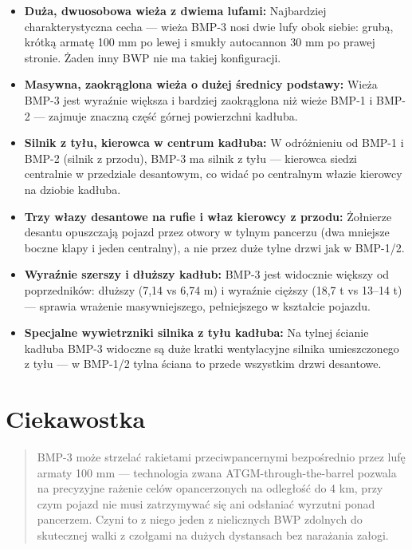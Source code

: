 \documentclass[12pt,openany,oneside]{book}
\providecommand{\tightlist}{%
  \setlength{\itemsep}{0pt}\setlength{\parskip}{0pt}}
\begin{document}
\begin{itemize}
\tightlist
\item
  \textbf{Duża, dwuosobowa wieża z dwiema lufami:} Najbardziej
  charakterystyczna cecha --- wieża BMP-3 nosi dwie lufy obok siebie:
  grubą, krótką armatę 100 mm po lewej i smukły autocannon 30 mm po
  prawej stronie. Żaden inny BWP nie ma takiej konfiguracji.
\item
  \textbf{Masywna, zaokrąglona wieża o dużej średnicy podstawy:} Wieża
  BMP-3 jest wyraźnie większa i bardziej zaokrąglona niż wieże BMP-1 i
  BMP-2 --- zajmuje znaczną część górnej powierzchni kadłuba.
\item
  \textbf{Silnik z tyłu, kierowca w centrum kadłuba:} W odróżnieniu od
  BMP-1 i BMP-2 (silnik z przodu), BMP-3 ma silnik z tyłu --- kierowca
  siedzi centralnie w przedziale desantowym, co widać po centralnym
  włazie kierowcy na dziobie kadłuba.
\item
  \textbf{Trzy włazy desantowe na rufie i właz kierowcy z przodu:}
  Żołnierze desantu opuszczają pojazd przez otwory w tylnym pancerzu
  (dwa mniejsze boczne klapy i jeden centralny), a nie przez duże tylne
  drzwi jak w BMP-1/2.
\item
  \textbf{Wyraźnie szerszy i dłuższy kadłub:} BMP-3 jest widocznie
  większy od poprzedników: dłuższy (7,14 vs 6,74 m) i wyraźnie cięższy
  (18,7 t vs 13--14 t) --- sprawia wrażenie masywniejszego, pełniejszego
  w kształcie pojazdu.
\item
  \textbf{Specjalne wywietrzniki silnika z tyłu kadłuba:} Na tylnej
  ścianie kadłuba BMP-3 widoczne są duże kratki wentylacyjne silnika
  umieszczonego z tyłu --- w BMP-1/2 tylna ściana to przede wszystkim
  drzwi desantowe.
\end{itemize}

\section{Ciekawostka}\label{ciekawostka-5}

\begin{quote}
BMP-3 może strzelać rakietami przeciwpancernymi bezpośrednio przez lufę
armaty 100 mm --- technologia zwana ATGM-through-the-barrel pozwala na
precyzyjne rażenie celów opancerzonych na odległość do 4 km, przy czym
pojazd nie musi zatrzymywać się ani odsłaniać wyrzutni ponad pancerzem.
Czyni to z niego jeden z nielicznych BWP zdolnych do skutecznej walki z
czołgami na dużych dystansach bez narażania załogi.
\end{quote}
\end{document}
